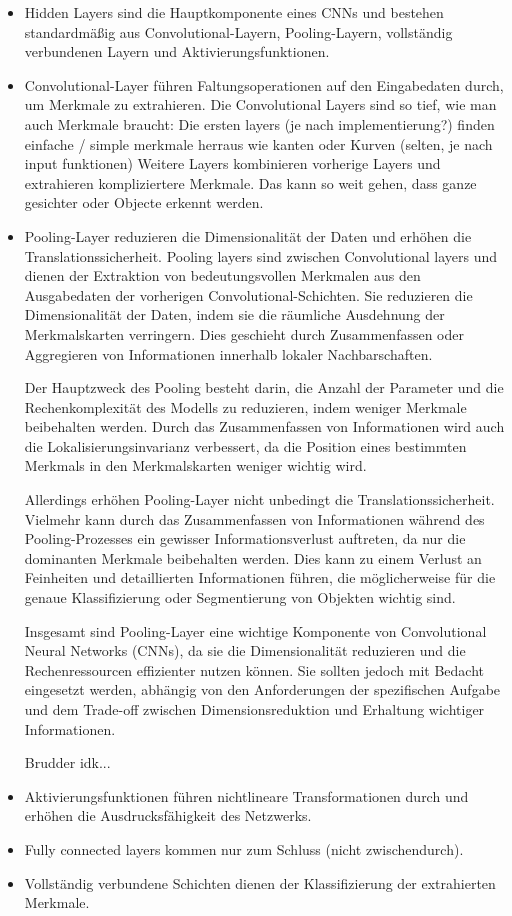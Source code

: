 \begin{itemize}
  \item Hidden Layers sind die Hauptkomponente eines CNNs und bestehen standardmäßig aus Convolutional-Layern, Pooling-Layern, vollständig verbundenen Layern und Aktivierungsfunktionen.
  \item Convolutional-Layer führen Faltungsoperationen auf den Eingabedaten durch, um Merkmale zu extrahieren.
  \subitem Die Convolutional Layers sind so tief, wie man auch Merkmale braucht: Die ersten layers (je nach implementierung?) finden einfache / simple merkmale herraus wie kanten oder Kurven (selten, je nach input funktionen)
  \subitem Weitere Layers kombinieren vorherige Layers und extrahieren kompliziertere Merkmale.
  \subitem Das kann so weit gehen, dass ganze gesichter oder Objecte erkennt werden. 
  \item Pooling-Layer reduzieren die Dimensionalität der Daten und erhöhen die Translationssicherheit.
  \subitem Pooling layers sind zwischen Convolutional layers und dienen der Extraktion von bedeutungsvollen Merkmalen aus den Ausgabedaten der vorherigen Convolutional-Schichten. Sie reduzieren die Dimensionalität der Daten, indem sie die räumliche Ausdehnung der Merkmalskarten verringern. Dies geschieht durch Zusammenfassen oder Aggregieren von Informationen innerhalb lokaler Nachbarschaften.

Der Hauptzweck des Pooling besteht darin, die Anzahl der Parameter und die Rechenkomplexität des Modells zu reduzieren, indem weniger Merkmale beibehalten werden. Durch das Zusammenfassen von Informationen wird auch die Lokalisierungsinvarianz verbessert, da die Position eines bestimmten Merkmals in den Merkmalskarten weniger wichtig wird.

Allerdings erhöhen Pooling-Layer nicht unbedingt die Translationssicherheit. Vielmehr kann durch das Zusammenfassen von Informationen während des Pooling-Prozesses ein gewisser Informationsverlust auftreten, da nur die dominanten Merkmale beibehalten werden. Dies kann zu einem Verlust an Feinheiten und detaillierten Informationen führen, die möglicherweise für die genaue Klassifizierung oder Segmentierung von Objekten wichtig sind.

Insgesamt sind Pooling-Layer eine wichtige Komponente von Convolutional Neural Networks (CNNs), da sie die Dimensionalität reduzieren und die Rechenressourcen effizienter nutzen können. Sie sollten jedoch mit Bedacht eingesetzt werden, abhängig von den Anforderungen der spezifischen Aufgabe und dem Trade-off zwischen Dimensionsreduktion und Erhaltung wichtiger Informationen.

Brudder idk...


  
  \item Aktivierungsfunktionen führen nichtlineare Transformationen durch und erhöhen die Ausdrucksfähigkeit des Netzwerks.
  \item Fully connected layers kommen nur zum Schluss (nicht zwischendurch).
  \item Vollständig verbundene Schichten dienen der Klassifizierung der extrahierten Merkmale.
\end{itemize}

